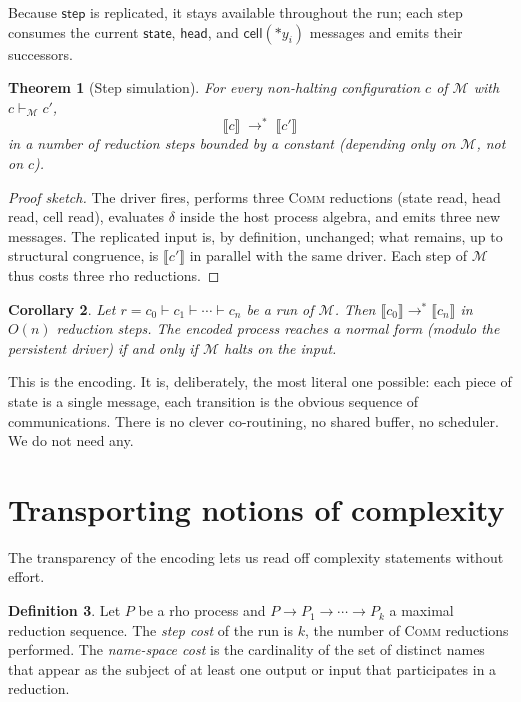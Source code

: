 \documentclass[11pt]{article}
\theoremstyle{plain}
\newtheorem{theorem}{Theorem}[section]
\newtheorem{corollary}[theorem]{Corollary}
\theoremstyle{definition}
\newtheorem{definition}[theorem]{Definition}
\theoremstyle{remark}
\newcommand{\drp}[1]{{\ast}#1}
\newcommand{\sembrack}[1]{\llbracket #1 \rrbracket}
\newcommand{\reduces}{\longrightarrow}
\newcommand{\TM}{\mathcal{M}}
\newcommand{\Step}{\mathsf{step}}
\newcommand{\Cell}{\mathsf{cell}}
\newcommand{\Head}{\mathsf{head}}
\newcommand{\St}{\mathsf{state}}
\begin{document}
\noindent Because $\Step$ is replicated, it stays available throughout the
run; each step consumes the current $\St$, $\Head$, and $\Cell(\drp{y_i})$
messages and emits their successors.

\begin{theorem}[Step simulation]\label{thm:sim}
For every non-halting configuration $c$ of $\TM$ with $c \vdash_\TM c'$,
$$
\sembrack{c} \;\reduces^*\; \sembrack{c'}
$$
in a number of reduction steps bounded by a constant (depending only on
$\TM$, not on $c$).
\end{theorem}

\begin{proof}[Proof sketch]
The driver fires, performs three \textsc{Comm} reductions (state read,
head read, cell read), evaluates $\delta$ inside the host process algebra,
and emits three new messages. The replicated input is, by definition,
unchanged; what remains, up to structural congruence, is $\sembrack{c'}$
in parallel with the same driver. Each step of $\TM$ thus costs three rho
reductions.
\end{proof}

\begin{corollary}\label{cor:full-run}
Let $r = c_0 \vdash c_1 \vdash \cdots \vdash c_n$ be a run of $\TM$.
Then $\sembrack{c_0} \reduces^* \sembrack{c_n}$ in $O(n)$ reduction steps.
The encoded process reaches a normal form (modulo the persistent driver)
if and only if $\TM$ halts on the input.
\end{corollary}

This is the encoding. It is, deliberately, the most literal one possible:
each piece of state is a single message, each transition is the obvious
sequence of communications. There is no clever co-routining, no shared
buffer, no scheduler. We do not need any.

\section{Transporting notions of complexity}\label{sec:complexity}

The transparency of the encoding lets us read off complexity statements
without effort.

\begin{definition}\label{def:rhocomplexity}
Let $P$ be a rho process and $P \reduces P_1 \reduces \cdots \reduces P_k$
a maximal reduction sequence. The \emph{step cost} of the run is $k$, the
number of \textsc{Comm} reductions performed. The \emph{name-space cost} is
the cardinality of the set of distinct names that appear as the subject of
at least one output or input that participates in a reduction.
\end{definition}
\end{document}
